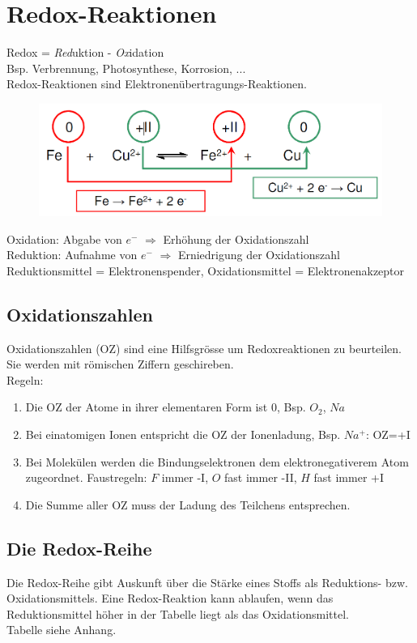 \section{Redox-Reaktionen}
Redox = \emph{Red}uktion - \emph{Ox}idation \\
Bsp. Verbrennung, Photosynthese, Korrosion, ... \\

Redox-Reaktionen sind Elektronenübertragungs-Reaktionen.
\begin{figure}[htbp]
	\centering
	\includegraphics[width=0.6\linewidth]{images/9_Redox_Reaktion.png}
\end{figure}

Oxidation: Abgabe von $e^-$ $\Rightarrow$ Erhöhung der Oxidationszahl \\
Reduktion: Aufnahme von $e^-$ $\Rightarrow$ Erniedrigung der Oxidationszahl \\

Reduktionsmittel = Elektronenspender, Oxidationsmittel = Elektronenakzeptor


\subsection{Oxidationszahlen}
Oxidationszahlen (OZ) sind eine Hilfsgrösse um Redoxreaktionen zu beurteilen. Sie werden mit römischen Ziffern geschireben. \\
Regeln:
\begin{enumerate}
	\item Die OZ der Atome in ihrer elementaren Form ist 0, Bsp. $O_2$, $Na$
	\item Bei einatomigen Ionen entspricht die OZ der Ionenladung, Bsp. $Na^+$: OZ=+I
	\item Bei Molekülen werden die Bindungselektronen dem elektronegativerem Atom zugeordnet. Faustregeln: $F$ immer -I, $O$ fast immer -II, $H$ fast immer +I
	\item Die Summe aller OZ muss der Ladung des Teilchens entsprechen.
\end{enumerate}

\subsection{Die Redox-Reihe}
Die Redox-Reihe gibt Auskunft über die Stärke eines Stoffs als Reduktions- bzw. Oxidationsmittels. Eine Redox-Reaktion kann ablaufen, wenn das Reduktionsmittel höher in der Tabelle liegt als das Oxidationsmittel.\\

Tabelle siehe Anhang. \\

